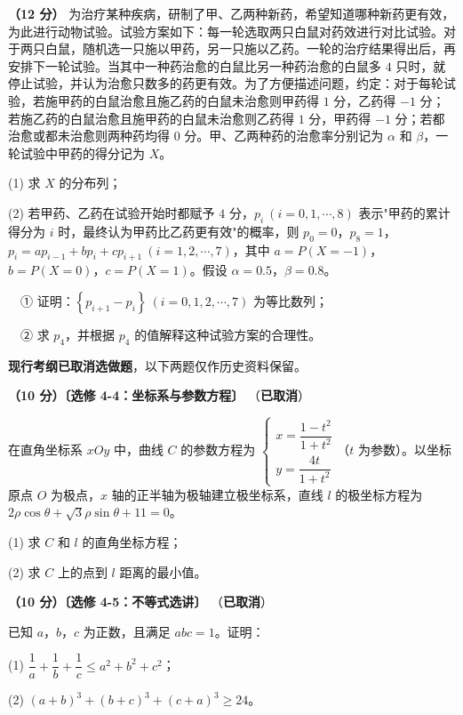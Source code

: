 \begin{question}
\textbf{（12 分）} 为治疗某种疾病，研制了甲、乙两种新药，希望知道哪种新药更有效，为此进行动物试验。试验方案如下：每一轮选取两只白鼠对药效进行对比试验。对于两只白鼠，随机选一只施以甲药，另一只施以乙药。一轮的治疗结果得出后，再安排下一轮试验。当其中一种药治愈的白鼠比另一种药治愈的白鼠多 $4$ 只时，就停止试验，并认为治愈只数多的药更有效。为了方便描述问题，约定：对于每轮试验，若施甲药的白鼠治愈且施乙药的白鼠未治愈则甲药得 $1$ 分，乙药得 $-1$ 分；若施乙药的白鼠治愈且施甲药的白鼠未治愈则乙药得 $1$ 分，甲药得 $-1$ 分；若都治愈或都未治愈则两种药均得 $0$ 分。甲、乙两种药的治愈率分别记为 $\alpha$ 和 $\beta$，一轮试验中甲药的得分记为 $X$。

  (1) 求 $X$ 的分布列；

  (2) 若甲药、乙药在试验开始时都赋予 $4$ 分，$p_i\ (i=0,1,\cdots,8)$ 表示"甲药的累计得分为 $i$ 时，最终认为甲药比乙药更有效"的概率，则 $p_0=0$，$p_8=1$，$p_i=ap_{i-1}+bp_i+cp_{i+1}\ (i=1,2,\cdots,7)$，其中 $a=P(X=-1)$，$b=P(X=0)$，$c=P(X=1)$。假设 $\alpha=0.5$，$\beta=0.8$。

  　① 证明：$\left\{p_{i+1}-p_i\right\}\ (i=0,1,2,\cdots,7)$ 为等比数列；

  　② 求 $p_4$，并根据 $p_4$ 的值解释这种试验方案的合理性。

\par\medskip

\end{question}

\begin{gktip}
\textbf{ 现行考纲已取消选做题}，以下两题仅作历史资料保留。
\end{gktip}

\begin{question}
\textbf{（10 分）〔选修 4-4：坐标系与参数方程〕} （\textbf{已取消}）

在直角坐标系 $xOy$ 中，曲线 $C$ 的参数方程为 $\begin{cases}x=\dfrac{1-t^{2}}{1+t^{2}}\\[2mm] y=\dfrac{4t}{1+t^{2}}\end{cases}$（$t$ 为参数）。以坐标原点 $O$ 为极点，$x$ 轴的正半轴为极轴建立极坐标系，直线 $l$ 的极坐标方程为 $2\rho\cos\theta+\sqrt3\rho\sin\theta+11=0$。

  (1) 求 $C$ 和 $l$ 的直角坐标方程；

  (2) 求 $C$ 上的点到 $l$ 距离的最小值。

\end{question}
\begin{question}
\textbf{（10 分）〔选修 4-5：不等式选讲〕} （\textbf{已取消}）

已知 $a$，$b$，$c$ 为正数，且满足 $abc=1$。证明：

  (1) $\dfrac1a+\dfrac1b+\dfrac1c\le a^{2}+b^{2}+c^{2}$；

  (2) $(a+b)^{3}+(b+c)^{3}+(c+a)^{3}\ge24$。

\par\medskip


\end{question}